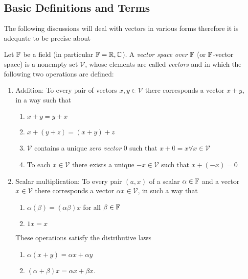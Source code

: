 \subsection{Basic Definitions and Terms}

The following discussions will deal with vectors in various forms therefore
it is adequate to be precise about
\begin{definition}
	Let $\mathbb{F}$ be a field (in particular $\mathbb{F} = \mathbb{R},\mathbb{C}$). A \emph{vector space
	over} $\mathbb{F}$ (or $\mathbb{F}$-vector space) is a nonempty set $\mathcal{V}$, whose
	elements are called \emph{vectors} and in which the following two operations
	are defined:
	\begin{enumerate}
		\item Addition: To every pair of vectors $x, y \in \mathcal{V}$ there
		corresponds a vector $x + y$, in a way such that
		\begin{enumerate}[label=(\alph*)]
			\item $x + y = y + x$
			\item $x + \left(y + z\right) = \left(x + y\right) + z$
			\item $\mathcal{V}$ contains a unique \emph{zero vector} $0$ such
			that $x + 0 = x \forall x \in \mathcal{V}$
			\item To each $x \in \mathcal{V}$ there exists a unique
			$-x \in \mathcal{V}$ such that $x + \left(-x\right) = 0$
		\end{enumerate}
		\item Scalar multiplication: To every pair $(a, x)$ of a scalar
		$\alpha \in \mathbb{F}$ and a vector $x \in \mathcal{V}$ there corresponds a
		vector $\alpha x \in \mathcal{V}$, in such a way that
		\begin{enumerate}[label=(\alph*), start = 5]
			\item $\alpha \left(\beta\right) = \left(\alpha \beta\right) x$ for
			all $\beta \in \mathbb{F}$ 
			\item $1 x = x$
		\end{enumerate}
		These operations satisfy the distributive laws
		\begin{enumerate}[label=(\alph*), start = 7]
			\item $\alpha \left(x + y\right) = \alpha x + \alpha y$
			\item $\left(\alpha + \beta\right) x = \alpha x + \beta x$.
		\end{enumerate}
	\end{enumerate}
\end{definition}

